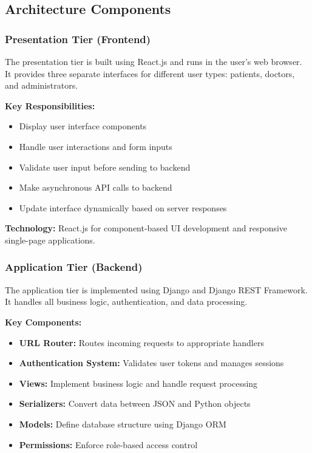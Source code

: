 \documentclass[11pt,a4paper]{article}
\begin{document}
\subsection{Architecture Components}

\subsubsection{Presentation Tier (Frontend)}

The presentation tier is built using React.js and runs in the user's web browser. It provides three separate interfaces for different user types: patients, doctors, and administrators.

\noindent
\textbf{Key Responsibilities:}
\begin{itemize}
    \item Display user interface components
    \item Handle user interactions and form inputs
    \item Validate user input before sending to backend
    \item Make asynchronous API calls to backend
    \item Update interface dynamically based on server responses
\end{itemize}

\noindent
\textbf{Technology:} React.js for component-based UI development and responsive single-page applications.

\subsubsection{Application Tier (Backend)}

The application tier is implemented using Django and Django REST Framework. It handles all business logic, authentication, and data processing.

\noindent
\textbf{Key Components:}
\begin{itemize}
    \item \textbf{URL Router:} Routes incoming requests to appropriate handlers
    \item \textbf{Authentication System:} Validates user tokens and manages sessions
    \item \textbf{Views:} Implement business logic and handle request processing
    \item \textbf{Serializers:} Convert data between JSON and Python objects
    \item \textbf{Models:} Define database structure using Django ORM
    \item \textbf{Permissions:} Enforce role-based access control
\end{itemize}
\end{document}
